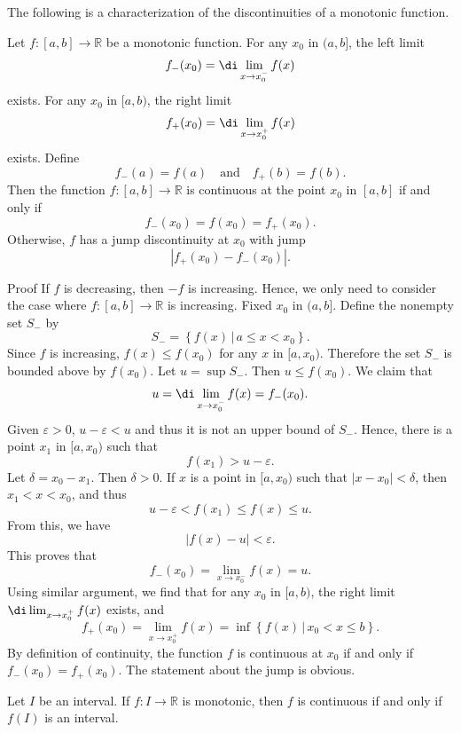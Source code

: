 \begin{example}
\newpage

The following is a characterization of the discontinuities of a  monotonic function.
\begin{theorem}[label=23021103]{}
Let $f:[a,b]\rightarrow\mathbb{R}$ be a  monotonic function. For any $x_0$ in $(a, b]$, 
the left limit \[f_-(x_0)=\di \lim_{x\rightarrow x_0^-}f(x)\] exists. For any $x_0$ in $[a, b)$,    the right limit \[f_+(x_0)=\di\lim_{x\rightarrow x_0^+}f(x)\] exists. 
Define
\[f_-(a)=f(a)\quad\text{and}\quad f_+(b)=f(b).\] Then the  function $f:[a,b]\rightarrow\mathbb{R}$ is continuous at the point $x_0$ in $[a,b]$ if and only if 
\[f_-(x_0)=f(x_0)=f_+(x_0).\]
Otherwise, $f$ has a jump discontinuity at $x_0$ with jump \[|f_+(x_0)-f_-(x_0)|.\]
\end{theorem}


\begin{myproof}{Proof}
If $f$ is  decreasing, then $-f$ is  increasing. Hence, we only need to consider the case where  $f:[a,b]\rightarrow\mathbb{R}$  is  increasing.
Fixed $x_0$ in $(a, b]$. Define the nonempty set $S_-$ by
\[S_-=\left\{f(x)\,|\, a\leq x<x_0\right\}.\]
Since $f$ is  increasing,  $f(x)\leq f(x_0)$ for any $x$ in $[a, x_0)$. Therefore the set $S_-$ is bounded above by $f(x_0)$. Let $u=\sup S_-$. Then $u\leq f(x_0)$. 
We claim that
\[u=\di \lim_{x\rightarrow x_0^-}f(x)=f_-(x_0).\]
Given $\varepsilon>0$,  $u-\varepsilon <u$ and thus it is not an upper bound of $S_-$. Hence, there is a point $x_1$ in $[a, x_0)$ such that
\[f(x_1)>u- \varepsilon.\]\bp 
Let $\delta=x_0-x_1$. Then $\delta>0$. If $x$ is a point in $[a, x_0)$  such that $|x-x_0|<\delta$, then $x_1<x<x_0$, and thus
\[u-\varepsilon<f(x_1)\leq f(x)\leq u.\]From this, we have
\[|f(x)-u|<\varepsilon.\]This proves that
\[f_-(x_0)= \lim_{x\rightarrow x_0^-}f(x)=u.\]
Using similar argument, we find that for any $x_0$ in $[a, b)$, the right limit $\di\lim_{x\rightarrow x_0^+}f(x)$ exists, and
\[f_+(x_0)=\lim_{x\rightarrow x_0^+}f(x)=\inf \left\{f(x)\,|\, x_0<x\leq b\right\}.\]By definition of continuity, the function $f$ is continuous at $x_0$ if and only if $f_-(x_0)=f_+(x_0)$.
The statement about the jump is obvious.
 


\end{myproof}
 
\begin{corollary}[label=230222_1]{}
Let $I$ be an interval. If $f:I\rightarrow \mathbb{R}$ is monotonic, then $f$ is continuous if and only if $f(I)$ is an interval.
\end{corollary}



\end{example}
